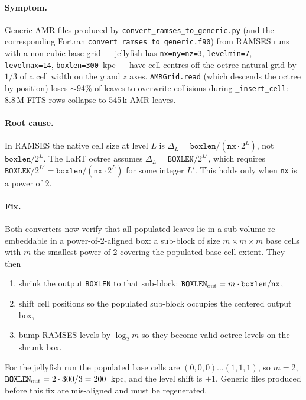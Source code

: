 \documentclass[english,a4paper]{my_memo}
\begin{document}
\paragraph{Symptom.}  Generic AMR files produced by
\texttt{convert\_ramses\_to\_generic.py} (and the corresponding Fortran
\texttt{convert\_ramses\_to\_generic.f90}) from RAMSES runs with a
non-cubic base grid --- jellyfish has \texttt{nx=ny=nz=3},
\texttt{levelmin=7}, \texttt{levelmax=14}, \texttt{boxlen=300}~kpc ---
have cell centres off the octree-natural grid by $1/3$ of a cell width
on the $y$ and $z$ axes.  \texttt{AMRGrid.read} (which descends the
octree by position) loses $\sim$94\% of leaves to overwrite collisions
during \texttt{\_insert\_cell}: 8.8\,M FITS rows collapse to 545\,k AMR
leaves.

\paragraph{Root cause.}  In RAMSES the native cell size at level $L$
is $\Delta_L = \texttt{boxlen}/(\texttt{nx}\cdot 2^L)$, not
$\texttt{boxlen}/2^L$.  The LaRT octree assumes
$\Delta_L = \texttt{BOXLEN}/2^{L'}$, which requires
$\texttt{BOXLEN}/2^{L'} = \texttt{boxlen}/(\texttt{nx}\cdot 2^L)$ for
some integer $L'$.  This holds only when \texttt{nx} is a power of 2.

\paragraph{Fix.}  Both converters now verify that all populated leaves
lie in a sub-volume re-embeddable in a power-of-2-aligned box: a
sub-block of size $m\times m\times m$ base cells with $m$ the smallest
power of 2 covering the populated base-cell extent.  They then
\begin{enumerate}
\item shrink the output \texttt{BOXLEN} to that sub-block:
      $\texttt{BOXLEN}_{\rm out} = m\cdot \texttt{boxlen}/\texttt{nx}$,
\item shift cell positions so the populated sub-block occupies the
      centered output box,
\item bump RAMSES levels by $\log_2 m$ so they become valid octree
      levels on the shrunk box.
\end{enumerate}
For the jellyfish run the populated base cells are
$(0,0,0)\dots(1,1,1)$, so $m=2$,
$\texttt{BOXLEN}_{\rm out}=2\cdot 300/3=200$~kpc, and the level shift is
$+1$.  Generic files produced before this fix are mis-aligned and must
be regenerated.
\end{document}
